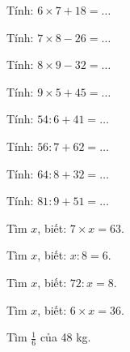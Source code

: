 \begin{ex}
Tính: $6 \times 7 + 18 = \dots$
\end{ex}

\begin{ex}
Tính: $7 \times 8 - 26 = \dots$
\end{ex}

\begin{ex}
Tính: $8 \times 9 - 32 = \dots$
\end{ex}

\begin{ex}
Tính: $9 \times 5 + 45 = \dots$
\end{ex}

\begin{ex}
Tính: $54 : 6 + 41 = \dots$
\end{ex}

\begin{ex}
Tính: $56 : 7 + 62 = \dots$
\end{ex}

\begin{ex}
Tính: $64 : 8 + 32 = \dots$
\end{ex}

\begin{ex}
Tính: $81 : 9 + 51 = \dots$
\end{ex}

\begin{ex}
Tìm $x$, biết: $7 \times x = 63$.
\end{ex}

\begin{ex}
Tìm $x$, biết: $x : 8 = 6$.
\end{ex}

\begin{ex}
Tìm $x$, biết: $72 : x = 8$.
\end{ex}

\begin{ex}
Tìm $x$, biết: $6 \times x = 36$.
\end{ex}

\begin{ex}
Tìm $\frac{1}{6}$ của 48 kg.
\end{ex}

